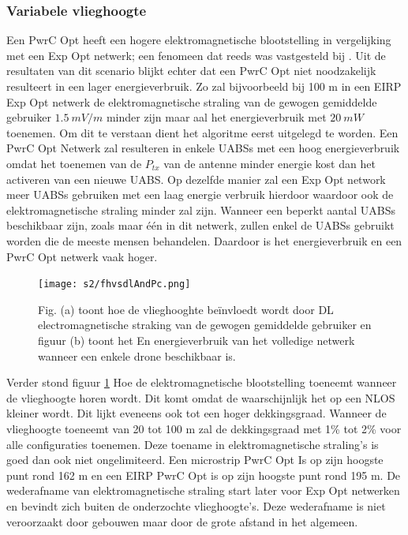 \documentclass[twocolumn]{phdsymp} %
\begin{document}
\subsubsection{Variabele vlieghoogte}
Een \gls{PwrC Opt} heeft een hogere elektromagnetische blootstelling in vergelijking met een
 \gls{Exp Opt} netwerk; een fenomeen dat reeds was vastgesteld bij \cite{J1}. 
Uit de resultaten van dit scenario blijkt echter dat een
\gls{PwrC Opt} niet noodzakelijk resulteert in een lager energieverbruik.
Zo zal bijvoorbeeld bij 100 m in een  \gls{EIRP} \gls{Exp Opt} netwerk
 de elektromagnetische straling van de gewogen gemiddelde gebruiker
 $1.5\ mV/m$ minder zijn maar aal het energieverbruik met $20\ mW$ toenemen.
Om dit te verstaan dient het algoritme eerst uitgelegd te worden.
Een  \gls{PwrC Opt} Netwerk zal resulteren in enkele \gls{UABS}s met een hoog energieverbruik 
omdat het toenemen van de $P_{tx}$ van de antenne minder energie kost dan het activeren van een nieuwe \gls{UABS}.
Op dezelfde manier zal een \gls{Exp Opt} network meer \gls{UABS}s gebruiken met een laag energie verbruik hierdoor waardoor ook de elektromagnetische straling minder zal zijn.
Wanneer een beperkt aantal \gls{UABS}s beschikbaar zijn, zoals maar \'e\'en in dit netwerk, 
zullen enkel de \gls{UABS}s gebruikt worden die de meeste mensen behandelen.
Daardoor is het energieverbruik en een \gls{PwrC Opt} netwerk vaak hoger.


\begin{figure}[h!]
  \texttt{[image: s2/fhvsdlAndPc.png]}
  \caption{Fig. (a) toont hoe de vlieghooghte be\"invloedt wordt door \acs{DL} electromagnetische straking van de 
  gewogen gemiddelde gebruiker en figuur (b) toont het En energieverbruik van het volledige netwerk wanneer een enkele drone beschikbaar is.}
  \label{fig:s2a_dlAndPc}
\end{figure}

Verder stond figuur  \ref{fig:s2a_dlAndPc} Hoe de elektromagnetische blootstelling toeneemt wanneer de vlieghoogte horen wordt. 
Dit komt omdat de waarschijnlijk het op een \gls{NLOS} kleiner wordt.
Dit lijkt eveneens ook tot een hoger dekkingsgraad.
Wanneer de vlieghoogte toeneemt van 20 tot 100 m zal de dekkingsgraad met 1\% tot 2\% voor alle configuraties toenemen.
Deze toename in elektromagnetische straling's is goed dan ook niet ongelimiteerd. Een microstrip \gls{PwrC Opt}
Is op zijn hoogste punt rond 162 m en een \gls{EIRP} \gls{PwrC Opt} is op zijn hoogste punt rond 195 m.
De wederafname van elektromagnetische straling start later voor \gls{Exp Opt} netwerken 
en bevindt zich buiten de onderzochte vlieghoogte's. 
Deze wederafname is niet veroorzaakt door gebouwen maar door de grote afstand in het algemeen.
\end{document}
